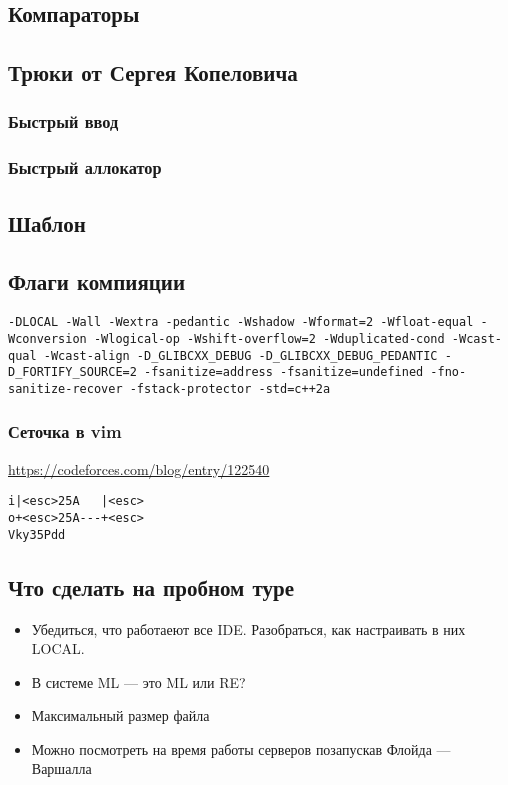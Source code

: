 \subsection{Компараторы}

\subsection{Трюки от Сергея Копеловича}
\subsubsection{Быстрый ввод}

\subsubsection{Быстрый аллокатор}

\subsection{Шаблон}

\subsection{Флаги компияции}
\texttt{-DLOCAL -Wall -Wextra -pedantic -Wshadow -Wformat=2 -Wfloat-equal -Wconversion -Wlogical-op -Wshift-overflow=2 -Wduplicated-cond -Wcast-qual -Wcast-align -D\_GLIBCXX\_DEBUG -D\_GLIBCXX\_DEBUG\_PEDANTIC -D\_FORTIFY\_SOURCE=2 -fsanitize=address -fsanitize=undefined -fno-sanitize-recover -fstack-protector -std=c++2a}
\subsubsection{Сеточка в vim}
\underline{\url{https://codeforces.com/blog/entry/122540}}

\begin{lstlisting}
i|<esc>25A   |<esc>
o+<esc>25A---+<esc>
Vky35Pdd
\end{lstlisting}
\subsection{Что сделать на пробном туре}
\begin{itemize}
\item Убедиться, что работаеют все IDE.
Разобраться, как настраивать в них LOCAL.
\item В системе ML --- это ML или RE?
\item Максимальный размер файла
\item Можно посмотреть на время работы серверов позапускав Флойда --- Варшалла
\end{itemize}
